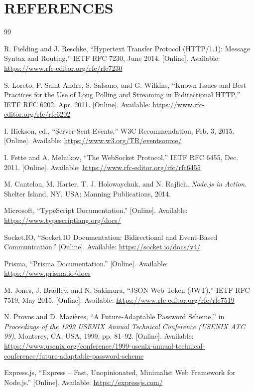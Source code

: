 \documentclass[12pt, a4paper]{article}
\begin{document}

\newpage

\section*{REFERENCES}

\begin{thebibliography}{99}

R. Fielding and J. Reschke,
``Hypertext Transfer Protocol (HTTP/1.1): Message Syntax and Routing,''
IETF RFC 7230, June 2014.
[Online]. Available: \url{https://www.rfc-editor.org/rfc/rfc7230}

S. Loreto, P. Saint-Andre, S. Salsano, and G. Wilkins,
``Known Issues and Best Practices for the Use of Long Polling and Streaming
in Bidirectional HTTP,''
IETF RFC 6202, Apr. 2011.
[Online]. Available: \url{https://www.rfc-editor.org/rfc/rfc6202}

I. Hickson, ed.,
``Server-Sent Events,''
W3C Recommendation, Feb. 3, 2015.
[Online]. Available: \url{https://www.w3.org/TR/eventsource/}

I. Fette and A. Melnikov,
``The WebSocket Protocol,''
IETF RFC 6455, Dec. 2011.
[Online]. Available: \url{https://www.rfc-editor.org/rfc/rfc6455}

M. Cantelon, M. Harter, T. J. Holowaychuk, and N. Rajlich,
\textit{Node.js in Action}.
Shelter Island, NY, USA: Manning Publications, 2014.

Microsoft,
``TypeScript Documentation.''
[Online]. Available: \url{https://www.typescriptlang.org/docs/}

Socket.IO,
``Socket.IO Documentation: Bidirectional and Event-Based Communication.''
[Online]. Available: \url{https://socket.io/docs/v4/}

Prisma,
``Prisma Documentation.''
[Online]. Available: \url{https://www.prisma.io/docs}

M. Jones, J. Bradley, and N. Sakimura,
``JSON Web Token (JWT),''
IETF RFC 7519, May 2015.
[Online]. Available: \url{https://www.rfc-editor.org/rfc/rfc7519}

N. Provos and D. Mazi\`eres,
``A Future-Adaptable Password Scheme,''
in \textit{Proceedings of the 1999 USENIX Annual Technical Conference
(USENIX ATC 99)}, Monterey, CA, USA, 1999, pp. 81--92.
[Online]. Available:
\url{https://www.usenix.org/conference/1999-usenix-annual-technical-conference/future-adaptable-password-scheme}

Express.js,
``Express -- Fast, Unopinionated, Minimalist Web Framework for Node.js.''
[Online]. Available: \url{https://expressjs.com/}

\end{thebibliography}
\end{document}
